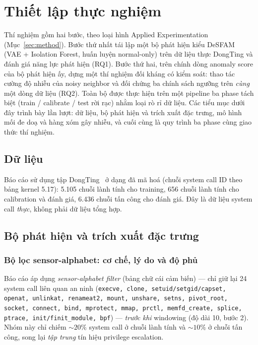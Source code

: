 \section{Thiết lập thực nghiệm}\label{sec:setup}

Thí nghiệm gồm hai bước, theo loại hình Applied Experimentation (Mục~\ref{sec:method}). Bước thứ nhất tái lập một bộ phát hiện kiểu DeSFAM (VAE + Isolation Forest, huấn luyện normal-only) trên dữ liệu thực DongTing và đánh giá năng lực phát hiện (RQ1). Bước thứ hai, trên chính dòng anomaly score của bộ phát hiện ấy, dựng một thí nghiệm đối kháng có kiểm soát: thao tác cường độ nhiễu của noisy neighbor và đối chứng ba chính sách ngưỡng trên \textit{cùng} một dòng dữ liệu (RQ2). Toàn bộ được thực hiện trên một pipeline ba phase tách biệt (train / calibrate / test rời rạc) nhằm loại rò rỉ dữ liệu. Các tiểu mục dưới đây trình bày lần lượt: dữ liệu, bộ phát hiện và trích xuất đặc trưng, mô hình mối đe doạ và hàng xóm gây nhiễu, và cuối cùng là quy trình ba phase cùng giao thức thí nghiệm.

\subsection{Dữ liệu}
Báo cáo sử dụng tập DongTing~\cite{dongting2023} ở dạng đã mã hoá (chuỗi system call ID theo bảng kernel 5.17): 5.105 chuỗi lành tính cho training, 656 chuỗi lành tính cho calibration và đánh giá, 6.436 chuỗi tấn công cho đánh giá. Đây là dữ liệu system call \textit{thực}, không phải dữ liệu tổng hợp.

\subsection{Bộ phát hiện và trích xuất đặc trưng}
\subsubsection{Bộ lọc sensor-alphabet: cơ chế, lý do và độ phủ}
Báo cáo áp dụng \textit{sensor-alphabet filter} (bảng chữ cái cảm biến) — chỉ giữ lại 24 system call liên quan an ninh (\texttt{execve, clone, setuid/setgid/capset, openat, unlinkat, renameat2, mount, unshare, setns, pivot\_root, socket, connect, bind, mprotect, mmap, prctl, memfd\_create, splice, ptrace, init/finit\_module, bpf}) — \textit{trước khi} windowing (độ dài 10, bước 2). Nhóm này chỉ chiếm $\sim 20\%$ system call ở chuỗi lành tính và $\sim 10\%$ ở chuỗi tấn công, song lại \textit{tập trung} tín hiệu privilege escalation.

